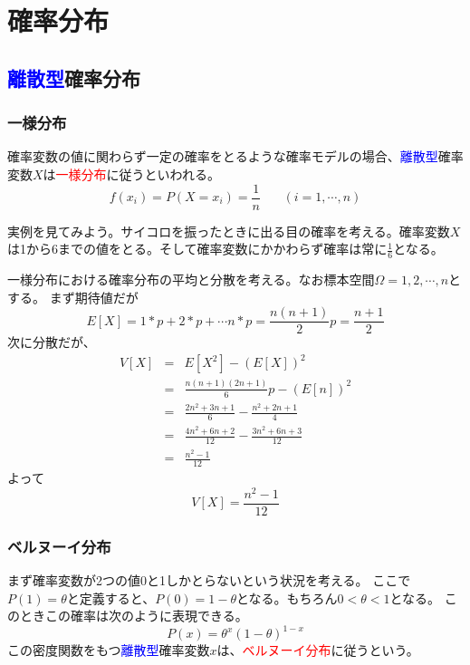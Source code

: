 \documentclass[a4paper,10pt]{jarticle}
\begin{document}
\section{確率分布}
\subsection{\textcolor{blue}{離散型}確率分布}
\subsubsection{一様分布}
確率変数の値に関わらず一定の確率をとるような確率モデルの場合、\textcolor{blue}{離散型}確率変数$X$は\textcolor{red}{一様分布}に従うといわれる。
\begin{equation}
    f(x_i) = P(X=x_i) = \frac{1}{n}\ \ \ \ \ \ \ \ (i=1,\cdots ,n)\tag{3,1}
\end{equation}

実例を見てみよう。サイコロを振ったときに出る目の確率を考える。確率変数$X$は1から6までの値をとる。そして確率変数にかかわらず確率は常に$\frac{1}{6}$となる。

一様分布における確率分布の平均と分散を考える。なお標本空間$\Omega={1,2,\cdots,n}$とする。
まず期待値だが
\begin{equation}
    E[X] = 1*p+2*p+\cdots n*p = \frac{n(n+1)}{2}p = \frac{n+1}{2}\tag{3,2}
\end{equation}
次に分散だが、
\begin{eqnarray*}
    V[X] &=& E[X^2]-(E[X])^2\\
    &=& \frac{n(n+1)(2n+1)}{6}p-(E[n])^2\\
    &=& \frac{2n^2+3n+1}{6}-\frac{n^2+2n+1}{4}\\
    &=& \frac{4n^2+6n+2}{12}-\frac{3n^2+6n+3}{12}\\
    &=&\frac{n^2-1}{12}
\end{eqnarray*}
よって
\begin{equation}
    V[X] = \frac{n^2-1}{12}\tag{3,3}
\end{equation}

\subsubsection{ベルヌーイ分布}
まず確率変数が2つの値0と1しかとらないという状況を考える。
ここで$P(1)=\theta$と定義すると、$P(0)=1-\theta$となる。もちろん$0<\theta < 1$となる。
このときこの確率は次のように表現できる。
\begin{equation}
    P(x) = \theta^x (1-\theta)^{1-x}\tag{3,4}
\end{equation}
この密度関数をもつ\textcolor{blue}{離散型}確率変数$x$は、\textcolor{red}{ベルヌーイ分布}に従うという。
\end{document}
